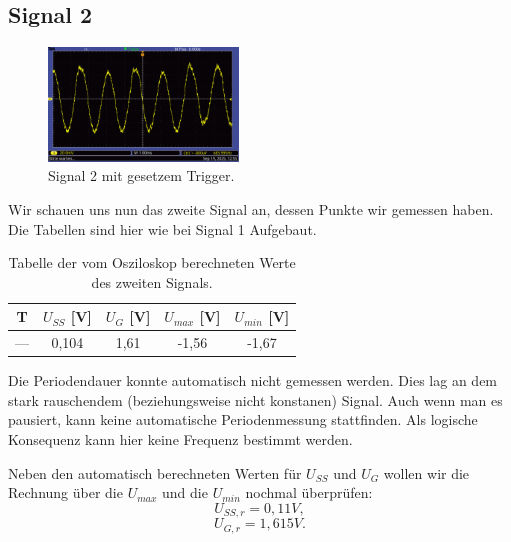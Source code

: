 


\subsection*{Signal 2}
\begin{figure} [h!]
    \centering
        \includegraphics[width=0.45\textwidth]{img/25/Signale2/Signal2-Clean.pdf}
    \caption{Signal 2 mit gesetzem Trigger.}
\end{figure}

Wir schauen uns nun das zweite Signal an, dessen Punkte wir gemessen haben. Die Tabellen sind hier wie bei Signal 1 Aufgebaut.

\begin{table}[h!]
    \centering
    \begin{tabular}{c | c | c | c | c }
        \toprule
        T & $U_{SS}$ [V] & $U_{G}$ [V] & $U_{max}$ [V] & $U_{min}$ [V] \\
        \hline
        --- & 0,104 & 1,61 & -1,56 & -1,67 \\
        \bottomrule
    \end{tabular}
    \caption{Tabelle der vom Osziloskop berechneten Werte des zweiten Signals.}
    \label{tab:sig2_auto}
\end{table}

Die Periodendauer konnte automatisch nicht gemessen werden. Dies lag an dem stark rauschendem (beziehungsweise nicht konstanen) Signal. Auch wenn man es pausiert, kann keine automatische Periodenmessung stattfinden. Als logische Konsequenz kann hier keine Frequenz bestimmt werden.

Neben den automatisch berechneten Werten für $U_{SS}$ und $U_G$ wollen wir die Rechnung über die $U_{max}$ und die $U_{min}$ nochmal überprüfen:
\begin{equation}
    U_{SS,r} = 0,11 V,
\end{equation}
\begin{equation}
    U_{G,r} = 1,615 V.
\end{equation}


